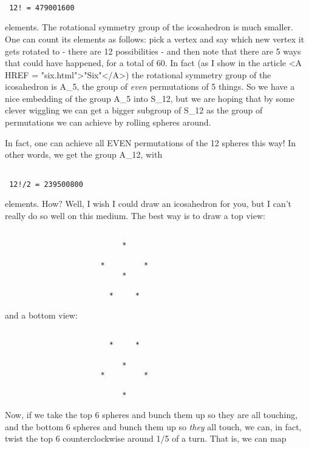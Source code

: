 \begin{verbatim}

 12! = 479001600
\end{verbatim}
    


elements.  The rotational symmetry group of the icosahedron is much
smaller.  One can count its elements as follows: pick a vertex and say
which new vertex it gets rotated to - there are 12 possibilities - and
then note that there are 5 ways that could have happened, for a total of
60.  In fact (as I show in the article <A HREF = "six.html">"Six"</A>)
the rotational symmetry group of the icosahedron is A_{5}, the
group of \emph{even} permutations of 5 things.  So we have a nice
embedding of the group A_{5} into S_{12}, but we are
hoping that by some clever wiggling we can get a bigger subgroup of
S_{12} as the group of permutations we can achieve by rolling
spheres around.

In fact, one can achieve all EVEN permutations of the 12 spheres this
way!  In other words, we get the group A_{12}, with


\begin{verbatim}

 12!/2 = 239500800
\end{verbatim}
    

elements.  How?  Well, I wish I could draw an icosahedron for you, but I
can't really do so well on this medium.  The best way is to draw a top
view: 

 

\begin{verbatim}

                           *
 
                      *         *
                           *
                        
                        *     *
\end{verbatim}
    

and a bottom view:


\begin{verbatim}

                        *     *

                           *
                      *         *  
                    
                           *
\end{verbatim}
    
  
Now, if we take the top 6 spheres and bunch them up so they are all
touching, and the bottom 6 spheres and bunch them up so \emph{they} all
touch, we can, in fact, twist the top 6 counterclockwise around 1/5 of a
turn.  That is, we can map


